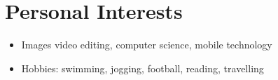 \documentclass[pdftex,a4paper,10pt,twoside,titlepage]{article}
\begin{document}
\section*{Personal Interests}
\begin{itemize}
	\item Images video  editing, computer science, mobile technology
	\item Hobbies: swimming, jogging, football, reading, travelling
\end{itemize}
\vfill
\vspace{1cm}
\end{document}
